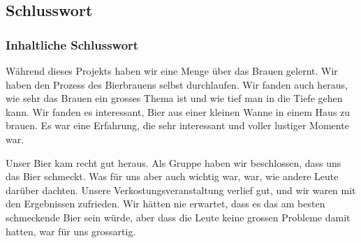 \subsection{Schlusswort}
\subsubsection{Inhaltliche Schlusswort}
Während dieses Projekts haben wir eine Menge über das Brauen gelernt. Wir haben den Prozess des Bierbrauens selbst durchlaufen. Wir fanden auch heraus, wie sehr das Brauen ein grosses Thema ist und wie tief man in die Tiefe gehen kann. Wir fanden es interessant, Bier aus einer kleinen Wanne in einem Haus zu brauen. Es war eine Erfahrung, die sehr interessant und voller lustiger Momente war. 

Unser Bier kam recht gut heraus.
 Als Gruppe haben wir beschlossen, dass uns das Bier schmeckt. 
 Was für uns aber auch wichtig war, war, wie andere Leute darüber dachten.
  Unsere Verkostungsveranstaltung verlief gut, und wir waren mit den Ergebnissen zufrieden.
   Wir hätten nie erwartet, dass es das am besten schmeckende Bier sein würde, aber dass die Leute 
   keine grossen Probleme damit hatten, war für uns grossartig.
\newpage
